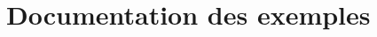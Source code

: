\documentclass[twoside]{book}
\newcommand{\+}{\discretionary{\mbox{\scriptsize$\hookleftarrow$}}{}{}}
\newcommand{\clearemptydoublepage}{%
    \newpage{\pagestyle{empty}\cleardoublepage}%
  }
\begin{document}
\chapter{Documentation des exemples}


  \backmatter
  \newpage
  \clearemptydoublepage
  \printindex
\end{document}

